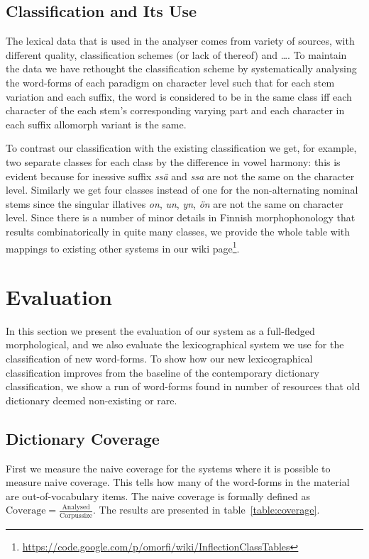 \documentclass[a4paper,12pt]{article}
\begin{document}
\subsection{Classification and Its Use}

The lexical data that is used in the analyser comes from variety of sources,
with different quality, classification schemes (or lack of thereof) and \ldots.
To maintain the data we have rethought the classification scheme by
systematically analysing the word-forms of each paradigm on character level such
that for each stem variation and each suffix, the word is considered to be in
the same class iff each character of the each stem's corresponding varying part
and each character in each suffix allomorph variant is the same. 

To contrast our classification with the existing classification we get, for
example, two separate classes for each class by the difference in vowel
harmony: this is evident because for inessive suffix \emph{ssä} and \emph{ssa}
are not the same on the character level. Similarly we get four classes instead
of one for the non-alternating nominal stems since the singular illatives
\emph{on}, \emph{un}, \emph{yn}, \emph{ön} are not the same on character level.
Since there is a number of minor details in Finnish morphophonology that
results combinatorically in quite many classes, we provide the whole table with
mappings to existing other systems in our wiki
page\footnote{\url{https://code.google.com/p/omorfi/wiki/InflectionClassTables}}.

\section{Evaluation}
\label{sec:evaluation}

In this section we present the evaluation of our system as a full-fledged
morphological, and we also evaluate the lexicographical system we use for
the classification of new word-forms. To show how our new lexicographical
classification improves from the baseline of the contemporary dictionary
classification, we show a run of word-forms found in number of resources that
old dictionary deemed non-existing or rare.

\subsection{Dictionary Coverage}

First we measure the naive coverage for the systems where it is possible to
measure naive coverage. This tells how many of the word-forms in the material
are out-of-vocabulary items. The naive coverage is formally defined as
$\mathrm{Coverage} = \frac{\mathrm{Analysed}}{\mathrm{Corpus size}}$. The
results are presented in table~\ref{table:coverage}. 
\end{document}
